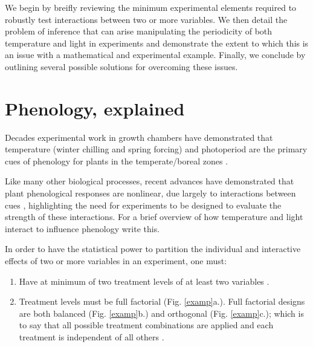 \documentclass[11pt]{article}
\begin{document}
We begin by breifly reviewing the minimum experimental elements required to robustly test interactions between two or more variables. We then detail the problem of inference that can arise manipulating the periodicity of both temperature and light in experiments and demonstrate the extent to which this is an issue with a mathematical and experimental example. Finally, we conclude by outlining several possible solutions for overcoming these issues. 

\section*{Phenology, explained}
Decades experimental work in growth chambers have demonstrated that temperature (winter chilling and spring forcing) and photoperiod are the primary cues of phenology for plants in the temperate/boreal zones \citep{}.


Like many other biological processes, recent advances have demonstrated that plant phenological responses are nonlinear, due largely to interactions between cues \citep{}, highlighting the need for experiments
to be designed to evaluate the strength of these interactions. For a brief overview of how temperature and light interact to influence phenology write this.

\noindent In order to have the statistical power to partition the individual and interactive effects of two or more variables in an experiment, one must:
\begin{enumerate}
\item Have at minimum of two treatment levels of at least two variables \citep{}.
\item Treatment levels must be full factorial (Fig. \ref{examp}a.). Full factorial designs are both balanced (Fig. \ref{examp}b.)  and orthogonal (Fig. \ref{examp}c.); which is to say that all possible treatment combinations are applied and each treatment is independent of all others \citep{}.
\end{enumerate}
\end{document}
